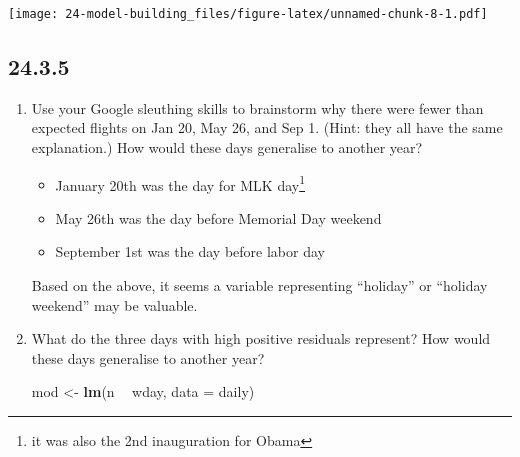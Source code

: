\documentclass[]{book}
\newenvironment{Shaded}{\begin{snugshade}}{\end{snugshade}}
\newcommand{\DataTypeTok}[1]{\textcolor[rgb]{0.13,0.29,0.53}{#1}}
\newcommand{\KeywordTok}[1]{\textcolor[rgb]{0.13,0.29,0.53}{\textbf{#1}}}
\newcommand{\NormalTok}[1]{#1}
\newcommand{\OperatorTok}[1]{\textcolor[rgb]{0.81,0.36,0.00}{\textbf{#1}}}
\newcommand{\OtherTok}[1]{\textcolor[rgb]{0.56,0.35,0.01}{#1}}
\newcommand{\StringTok}[1]{\textcolor[rgb]{0.31,0.60,0.02}{#1}}
\providecommand{\tightlist}{%
  \setlength{\itemsep}{0pt}\setlength{\parskip}{0pt}}
\let\rmarkdownfootnote\footnote%
\def\footnote{\protect\rmarkdownfootnote}
\theoremstyle{definition}
\theoremstyle{definition}
\theoremstyle{definition}
\theoremstyle{remark}
\begin{document}
\texttt{[image: 24-model-building\_files/figure-latex/unnamed-chunk-8-1.pdf]}

\hypertarget{section-83}{%
\subsection{24.3.5}\label{section-83}}

\begin{enumerate}
\def\labelenumi{\arabic{enumi}.}
\item
  Use your Google sleuthing skills to brainstorm why there were fewer
  than expected flights on Jan 20, May 26, and Sep 1. (Hint: they all
  have the same explanation.) How would these days generalise to another
  year?

  \begin{itemize}
  \tightlist
  \item
    January 20th was the day for MLK day\footnote{it was also the 2nd
      inauguration for Obama}
  \item
    May 26th was the day before Memorial Day weekend
  \item
    September 1st was the day before labor day
  \end{itemize}

  Based on the above, it seems a variable representing ``holiday'' or
  ``holiday weekend'' may be valuable.
\item
  What do the three days with high positive residuals represent? How
  would these days generalise to another year?

\begin{Shaded}
\end{Shaded}

\begin{Shaded}
\begin{Highlighting}[]
\NormalTok{mod <-}\StringTok{ }\KeywordTok{lm}\NormalTok{(n }\OperatorTok{~}\StringTok{ }\NormalTok{wday, }\DataTypeTok{data =}\NormalTok{ daily)}


\end{Highlighting}
\end{Shaded}
\end{enumerate}
\end{document}
